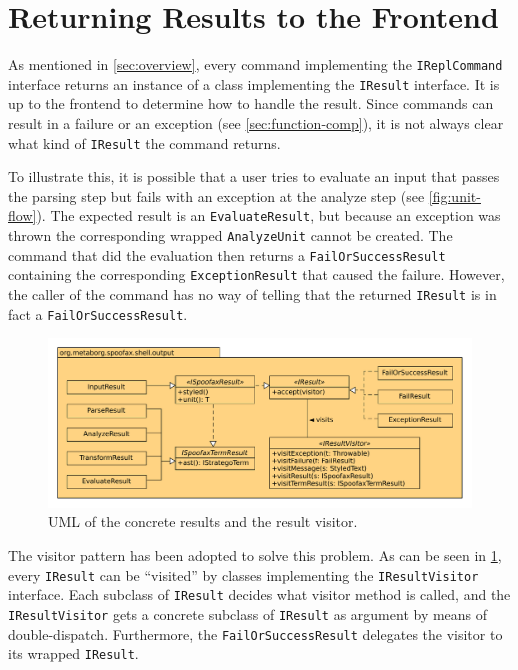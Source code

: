 \section{Returning Results to the Frontend}
\label{sec:visitor}

As mentioned in \cref{sec:overview}, every command implementing the
\texttt{IReplCommand} interface returns an instance of a class implementing
the \texttt{IResult} interface. It is up to the frontend to determine how to
handle the result. Since commands can result in a failure or an exception (see
\cref{sec:function-comp}), it is not always clear what kind of
\texttt{IResult} the command returns.

To illustrate this, it is possible that a user tries to evaluate an input that
passes the parsing step but fails with an exception at the analyze step (see
\cref{fig:unit-flow}). The expected result is an \texttt{EvaluateResult},
but because an exception was thrown the corresponding wrapped
\texttt{AnalyzeUnit} cannot be created. The command that did the evaluation
then returns a \texttt{FailOrSuccessResult} containing the corresponding
\texttt{ExceptionResult} that caused the failure. However, the caller of the
command has no way of telling that the returned \texttt{IResult} is in fact a
\texttt{FailOrSuccessResult}.

\begin{figure}[t]
  \centering
  \includegraphics[width=\textwidth]{uml-visitor}
  \caption{UML of the concrete results and the result visitor.}
  \label{fig:uml-visitor}
\end{figure}

The visitor pattern has been adopted to solve this problem. As can be seen in
\cref{fig:uml-visitor}, every \texttt{IResult} can be ``visited'' by classes
implementing the \texttt{IResultVisitor} interface. Each subclass of
\texttt{IResult} decides what visitor method is called, and the
\texttt{IResultVisitor} gets a concrete subclass of \texttt{IResult} as argument
by means of double-dispatch. Furthermore, the \texttt{FailOrSuccessResult}
delegates the visitor to its wrapped \texttt{IResult}.

